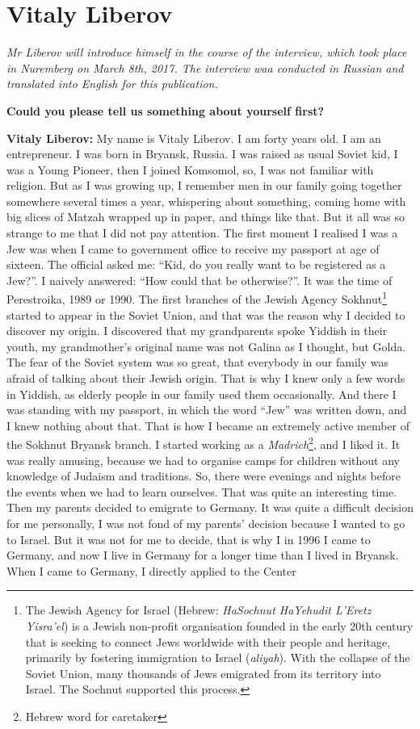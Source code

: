 \section{Vitaly Liberov}

\textit{Mr Liberov will introduce himself in the course of the interview, which took place in Nuremberg on March 8th, 2017. The interview waa conducted in Russian and translated into English for this publication.}\par
\vspace*{2em}
\textbf{Could you please tell us something about yourself first?} 

\textbf{Vitaly Liberov:} My name is Vitaly Liberov. I am forty years old. I am an entrepreneur. I was born in Bryansk, Russia. I was raised as usual Soviet kid, I was a Young Pioneer, then I joined Komsomol, so, I was not familiar with religion. But as I was growing up, I remember men in our family going together somewhere several times a year, whispering about something, coming home with big slices of Matzah wrapped up in paper, and things like that. But it all was so strange to me that I did not pay attention. The first moment I realised I was a Jew was when I came to government office to receive my passport at age of sixteen. The official asked me: “Kid, do you really want to be registered as a Jew?”. I naively answered: “How could that be otherwise?”. It was the time of Perestroika, 1989 or 1990. The first branches of the Jewish Agency Sokhnut\footnote{The Jewish Agency for Israel (Hebrew: \textit{HaSochnut HaYehudit L'Eretz Yisra'el}) is a Jewish non-profit organisation founded in the early 20th century that is seeking to connect Jews worldwide with their people and heritage, primarily by fostering immigration to Israel (\textit{aliyah}). With the collapse of the Soviet Union, many thousands of Jews emigrated from its territory into Israel. The Sochnut supported this process.} started to appear in the Soviet Union, and that was the reason why I decided to discover my origin. I discovered that my grandparents spoke Yiddish in their youth, my grandmother’s original name was not Galina as I thought, but Golda. The fear of the Soviet system was so great, that everybody in our family was afraid of talking about their Jewish origin. That is why I knew only a few words in Yiddish, as elderly people in our family used them occasionally. And there I was standing with my passport, in which the word “Jew” was written down, and I knew nothing about that. That is how I became an extremely active member of the Sokhnut Bryansk branch. I started working as a \textit{Madrich}\footnote{Hebrew word for caretaker}, and I liked it.  It was really amusing, because we had to organise camps for children without any knowledge of Judaism and traditions. So, there were evenings and nights before the events when we had to learn ourselves. That was quite an interesting time. Then my parents decided to emigrate to Germany. It was quite a difficult decision for me personally, I was not fond of my parents’ decision because I wanted to go to Israel. But it was not for me to decide, that is why I in 1996 I came to Germany, and now I live in Germany for a longer time than I lived in Bryansk. When I came to Germany, I directly applied to the Center 